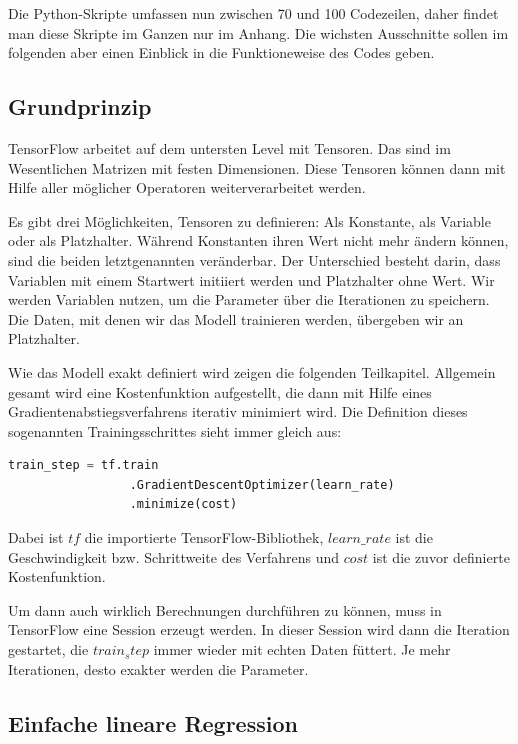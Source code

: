 Die Python-Skripte umfassen nun zwischen 70 und 100 Codezeilen, daher findet man diese Skripte im Ganzen nur im Anhang. Die wichsten Ausschnitte sollen im folgenden aber einen Einblick in die Funktioneweise des Codes geben.

\subsection{Grundprinzip}

TensorFlow arbeitet auf dem untersten Level mit Tensoren. Das sind im Wesentlichen Matrizen mit festen Dimensionen. Diese Tensoren können dann mit Hilfe aller möglicher Operatoren weiterverarbeitet werden.

Es gibt drei Möglichkeiten, Tensoren zu definieren: Als Konstante, als Variable oder als Platzhalter. Während Konstanten ihren Wert nicht mehr ändern können, sind die beiden letztgenannten veränderbar. Der Unterschied besteht darin, dass Variablen mit einem Startwert initiiert werden und Platzhalter ohne Wert. Wir werden Variablen nutzen, um die Parameter über die Iterationen zu speichern. Die Daten, mit denen wir das Modell trainieren werden, übergeben wir an Platzhalter.

Wie das Modell exakt definiert wird zeigen die folgenden Teilkapitel. Allgemein gesamt wird eine Kostenfunktion aufgestellt, die dann mit Hilfe eines Gradientenabstiegsverfahrens iterativ minimiert wird. Die Definition dieses sogenannten Trainingsschrittes sieht immer gleich aus:

\begin{lstlisting}[language=Python]
  train_step = tf.train
                 .GradientDescentOptimizer(learn_rate)
                 .minimize(cost)
\end{lstlisting}

Dabei ist $tf$ die importierte TensorFlow-Bibliothek, $learn\_rate$ ist die Geschwindigkeit bzw. Schrittweite des Verfahrens und $cost$ ist die zuvor definierte Kostenfunktion.

Um dann auch wirklich Berechnungen durchführen zu können, muss in TensorFlow eine Session erzeugt werden. In dieser Session wird dann die Iteration gestartet, die $train_step$ immer wieder mit echten Daten füttert. Je mehr Iterationen, desto exakter werden die Parameter.

\subsection{Einfache lineare Regression}

